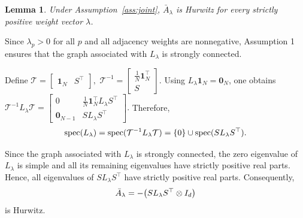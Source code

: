 \documentclass[conference]{IEEEtran}
\newtheorem{lemma}{Lemma}
\begin{document}
	
	
	\begin{lemma}\label{lem:average}
		Under Assumption~\ref{ass:joint},
		$\bar A_\lambda$ is Hurwitz for every strictly positive
		weight vector $\lambda$.
	\end{lemma}
	
	\begin{IEEEproof}
		Since $\lambda_p>0$ for all $p$ and all adjacency weights are nonnegative, Assumption 1 ensures that the graph associated with $L_\lambda$ is strongly connected.
		
		Define
		$
		\mathcal T
		=
		\begin{bmatrix}
			\mathbf 1_N & S^\top
		\end{bmatrix},
		$
		$
		\mathcal T^{-1}
		=
		\begin{bmatrix}
			\frac{1}{N}\mathbf 1_N^\top\\
			S
		\end{bmatrix}.
		$
		Using $L_\lambda\mathbf 1_N=\mathbf 0_N$, one obtains
		$
		\mathcal T^{-1}L_\lambda\mathcal T
		=
		\begin{bmatrix}
			0
			&
			\frac{1}{N}\mathbf 1_N^\top L_\lambda S^\top
			\\
			\mathbf 0_{N-1}
			&
			SL_\lambda S^\top
		\end{bmatrix}.
		$
		Therefore,
		\vspace{-0.2\baselineskip}
		\[
		\operatorname{spec}(L_\lambda)
		=\operatorname{spec}(\mathcal T^{-1}L_\lambda\mathcal T)
		=
		\{0\}
		\cup
		\operatorname{spec}(SL_\lambda S^\top).
		\vspace{-0.2\baselineskip}
		\]
		
		Since the graph associated with $L_\lambda$ is strongly connected,
		the zero eigenvalue of $L_\lambda$ is simple and all its remaining
		eigenvalues have strictly positive real parts. Hence, all eigenvalues
		of $SL_\lambda S^\top$ have strictly positive real parts.
		Consequently,
		\vspace{-0.2\baselineskip}
		\[
		\bar A_\lambda
		=
		-\bigl(SL_\lambda S^\top\otimes I_d\bigr)
		\vspace{-0.2\baselineskip}
		\]
		is Hurwitz.
	\end{IEEEproof}
	
\end{document}
